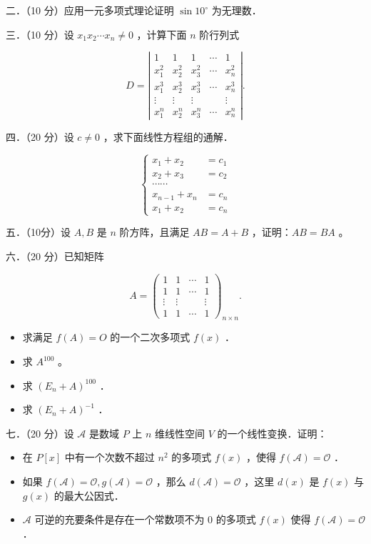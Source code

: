 \documentclass{article}
\begin{document}
二．（10 分）应用一元多项式理论证明 \(\sin 10^{\circ}\) 为无理数．

三．（10 分）设 \(x_{1} x_{2} \cdots x_{n} \neq 0\) ，计算下面 \(n\) 阶行列式

\[
D=\left|\begin{array}{ccccc}
1 & 1 & 1 & \cdots & 1 \\
x_{1}^{2} & x_{2}^{2} & x_{3}^{2} & \cdots & x_{n}^{2} \\
x_{1}^{3} & x_{2}^{3} & x_{3}^{3} & \cdots & x_{n}^{3} \\
\vdots & \vdots & \vdots & & \vdots \\
x_{1}^{n} & x_{2}^{n} & x_{3}^{n} & \cdots & x_{n}^{n}
\end{array}\right| .
\]

四．（20 分）设 \(c \neq 0\) ，求下面线性方程组的通解．

\[
\begin{cases}x_{1}+x_{2} & =c_{1} \\ x_{2}+x_{3} & =c_{2} \\ \cdots \cdots & \\ x_{n-1}+x_{n} & =c_{n} \\ x_{1}+x_{2} & =c_{n}\end{cases}
\]

五．（10分）设 \(A, B\) 是 \(n\) 阶方阵，且满足 \(A B=A+B\) ，证明：\(A B=B A\) 。

六．（20 分）已知矩阵

\[
A=\left(\begin{array}{cccc}
1 & 1 & \cdots & 1 \\
1 & 1 & \cdots & 1 \\
\vdots & \vdots & & \vdots \\
1 & 1 & \cdots & 1
\end{array}\right)_{n \times n} .
\]

\begin{itemize}
  \item[（1）] 求满足 \(f(A)=O\) 的一个二次多项式 \(f(x)\) ．
  \item[（2）] 求 \(A^{100}\) 。
  \item[（3）] 求 \(\left(E_{n}+A\right)^{100}\) ．
  \item[（4）] 求 \(\left(E_{n}+A\right)^{-1}\) ．
\end{itemize}

七．（20 分）设 \(\mathcal{A}\) 是数域 \(P\) 上 \(n\) 维线性空间 \(V\) 的一个线性变换．证明：

\begin{itemize}
  \item[（1）] 在 \(P[x]\) 中有一个次数不超过 \(n^{2}\) 的多项式 \(f(x)\) ，使得 \(f(\mathcal{A})=\mathcal{O}\) ．
  \item[（2）] 如果 \(f(\mathcal{A})=\mathcal{O}, g(\mathcal{A})=\mathcal{O}\) ，那么 \(d(\mathcal{A})=\mathcal{O}\) ，这里 \(d(x)\) 是 \(f(x)\) 与 \(g(x)\) 的最大公因式．
  \item[（3）] \(\mathcal{A}\) 可逆的充要条件是存在一个常数项不为 0 的多项式 \(f(x)\) 使得 \(f(\mathcal{A})=\mathcal{O}\) ．
\end{itemize}
\end{document}
